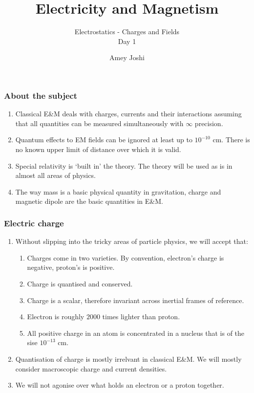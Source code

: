 \documentclass{beamer}
\title{Electricity and Magnetism}
\subtitle{Electrostatics - Charges and Fields \\ Day 1}
\author{Amey Joshi}
\begin{document}
\frame{\titlepage}

\begin{frame}
\frametitle{About the subject}
\begin{enumerate}
\item Classical E\&M deals with charges, currents and their interactions assuming that all quantities can be measured 
simultaneously with $\infty$ precision.
\item Quantum effects to EM fields can be ignored at least up to $10^{-10}$ cm.  There is no known upper limit of distance
over which it is valid.
\item Special relativity is `built in' the theory.
The theory will be used as is in almost all areas of physics.
\item The way mass is a basic physical quantity in gravitation, charge and magnetic dipole are the basic quantities in E\&M.

\end{enumerate}
\end{frame}

\begin{frame}
\frametitle{Electric charge}
\begin{enumerate}
\item Without slipping into the tricky areas of particle physics, we will accept that:
\begin{enumerate}
\item Charges come in two varieties. By convention, electron's charge is negative, proton's is positive.
\item Charge is quantised and conserved.
\item Charge is a scalar, therefore invariant across inertial frames of reference.
\item Electron is roughly $2000$ times lighter than proton. 
\item All positive charge in an atom is concentrated in a nucleus that is of the sise $10^{-13}$ cm.
\end{enumerate}
\item Quantisation of charge is mostly irrelvant in classical E\&M. We will mostly consider macroscopic charge and current
densities.
\item We will not agonise over what holds an electron or a proton together.
\end{enumerate}
\end{frame}
\end{document}
